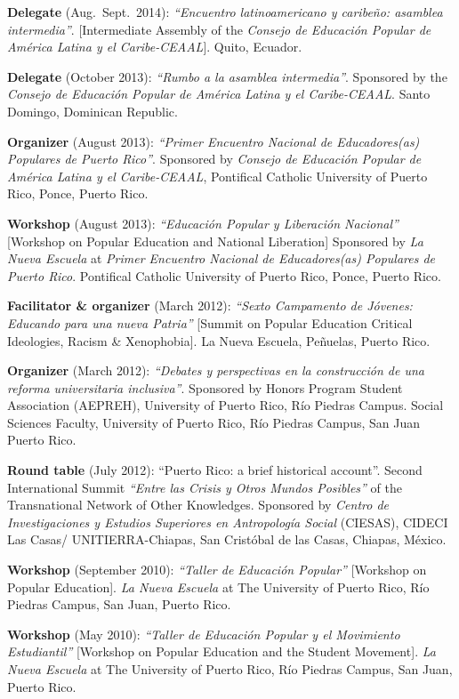\documentclass[11pt,a4paper,]{awesome-cv}
\begin{document}
\textbf{Delegate} (Aug.~Sept.~2014): \emph{``Encuentro latinoamericano y
caribeño: asamblea intermedia''}. {[}Intermediate Assembly of the
\emph{Consejo de Educación Popular de América Latina y el
Caribe-CEAAL}{]}. Quito, Ecuador.

\textbf{Delegate} (October 2013): \emph{``Rumbo a la asamblea
intermedia''}. Sponsored by the \emph{Consejo de Educación Popular de
América Latina y el Caribe-CEAAL}. Santo Domingo, Dominican Republic.

\textbf{Organizer} (August 2013): \emph{``Primer Encuentro Nacional de
Educadores(as) Populares de Puerto Rico''}. Sponsored by \emph{Consejo
de Educación Popular de América Latina y el Caribe-CEAAL}, Pontifical
Catholic University of Puerto Rico, Ponce, Puerto Rico.

\textbf{Workshop} (August 2013): \emph{``Educación Popular y Liberación
Nacional''} {[}Workshop on Popular Education and National Liberation{]}
Sponsored by \emph{La Nueva Escuela} at \emph{Primer Encuentro Nacional
de Educadores(as) Populares de Puerto Rico}. Pontifical Catholic
University of Puerto Rico, Ponce, Puerto Rico.

\textbf{Facilitator \& organizer} (March 2012): \emph{``Sexto Campamento
de Jóvenes: Educando para una nueva Patria''} {[}Summit on Popular
Education Critical Ideologies, Racism \& Xenophobia{]}. La Nueva
Escuela, Peñuelas, Puerto Rico.

\textbf{Organizer} (March 2012): \emph{``Debates y perspectivas en la
construcción de una reforma universitaria inclusiva''}. Sponsored by
Honors Program Student Association (AEPREH), University of Puerto Rico,
Río Piedras Campus. Social Sciences Faculty, University of Puerto Rico,
Río Piedras Campus, San Juan Puerto Rico.

\textbf{Round table} (July 2012): ``Puerto Rico: a brief historical
account''. Second International Summit \emph{``Entre las Crisis y Otros
Mundos Posibles''} of the Transnational Network of Other Knowledges.
Sponsored by \emph{Centro de Investigaciones y Estudios Superiores en
Antropología Social} (CIESAS), CIDECI Las Casas/ UNITIERRA-Chiapas, San
Cristóbal de las Casas, Chiapas, México.

\textbf{Workshop} (September 2010): \emph{``Taller de Educación
Popular''} {[}Workshop on Popular Education{]}. \emph{La Nueva Escuela}
at The University of Puerto Rico, Río Piedras Campus, San Juan, Puerto
Rico.

\textbf{Workshop} (May 2010): \emph{``Taller de Educación Popular y el
Movimiento Estudiantil''} {[}Workshop on Popular Education and the
Student Movement{]}. \emph{La Nueva Escuela} at The University of Puerto
Rico, Río Piedras Campus, San Juan, Puerto Rico.
\end{document}
